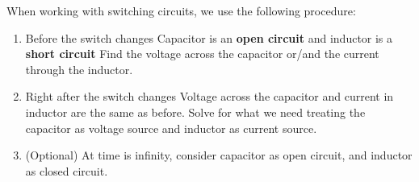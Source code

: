 \documentclass[12pt,letterpaper]{article} \usepackage{amsmath} \usepackage{graphicx} \usepackage[margin=1in]{geometry} \usepackage{longtable}  \usepackage{amssymb}
\begin{document}
	When working with switching circuits, we use the following procedure:
	\begin{enumerate}[noitemsep]
		\item Before the switch changes
		\subitem Capacitor is an \textbf{open circuit }and inductor is a \textbf{short circuit}
		\subitem Find the voltage across the capacitor or/and the current through the inductor.
		\item Right after the switch changes
		\subitem Voltage across the capacitor and current in inductor are the same as before.
		\subitem Solve for what we need treating the capacitor as voltage source and inductor as current source.
		\item (Optional) At time is infinity, consider capacitor as open circuit, and inductor as closed circuit. 
	\end{enumerate}
\end{document}
